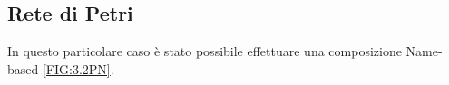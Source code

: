 \documentclass[a4paper]{article}
\begin{document}
\subsection{Rete di Petri}
In questo particolare caso è stato possibile effettuare una composizione Name-based \ref{FIG:3.2PN}.
\begin{figure}[!ht]
\centering
{}
\end{figure}
\end{document}
